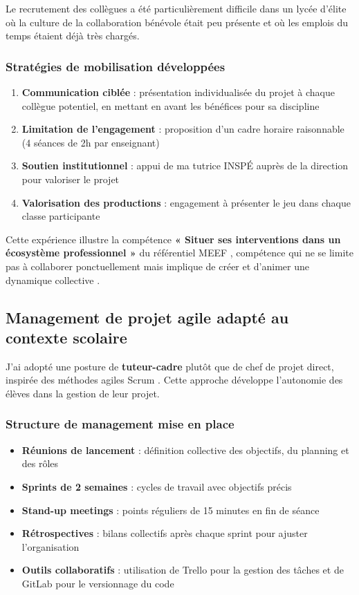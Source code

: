 Le recrutement des collègues a été particulièrement difficile dans un lycée d'élite où la culture de la collaboration bénévole était peu présente et où les emplois du temps étaient déjà très chargés.

\subsubsection{Stratégies de mobilisation développées}

\begin{enumerate}[leftmargin=*]
    \item \textbf{Communication ciblée} : présentation individualisée du projet à chaque collègue potentiel, en mettant en avant les bénéfices pour sa discipline
    \item \textbf{Limitation de l'engagement} : proposition d'un cadre horaire raisonnable (4 séances de 2h par enseignant)
    \item \textbf{Soutien institutionnel} : appui de ma tutrice INSPÉ auprès de la direction pour valoriser le projet
    \item \textbf{Valorisation des productions} : engagement à présenter le jeu dans chaque classe participante
\end{enumerate}

Cette expérience illustre la compétence \textbf{« Situer ses interventions dans un écosystème professionnel »} du référentiel MEEF \parencite{rncp38152}, compétence qui ne se limite pas à collaborer ponctuellement mais implique de créer et d'animer une dynamique collective \parencite{competences_transversales_eurecia}.

\subsection{Management de projet agile adapté au contexte scolaire}

J'ai adopté une posture de \textbf{tuteur-cadre} plutôt que de chef de projet direct, inspirée des méthodes agiles Scrum \parencite{scrum_education}. Cette approche développe l'autonomie des élèves dans la gestion de leur projet.

\subsubsection{Structure de management mise en place}

\begin{itemize}[leftmargin=*]
    \item \textbf{Réunions de lancement} : définition collective des objectifs, du planning et des rôles
    \item \textbf{Sprints de 2 semaines} : cycles de travail avec objectifs précis
    \item \textbf{Stand-up meetings} : points réguliers de 15 minutes en fin de séance
    \item \textbf{Rétrospectives} : bilans collectifs après chaque sprint pour ajuster l'organisation
    \item \textbf{Outils collaboratifs} : utilisation de Trello pour la gestion des tâches et de GitLab pour le versionnage du code
\end{itemize}

